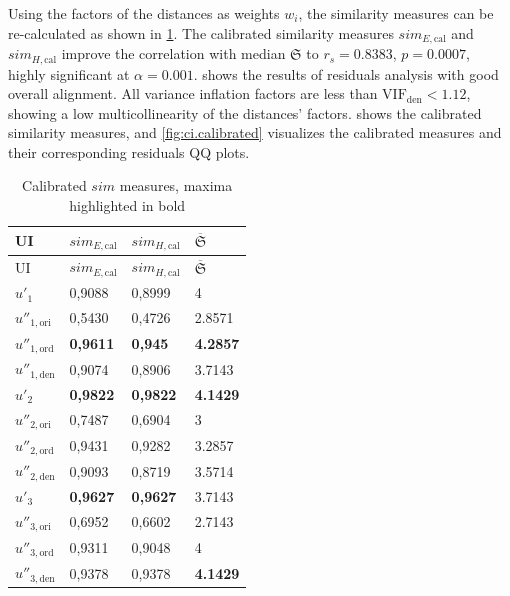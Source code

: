 \vspace{-15pt}
Using the factors of the distances as weights \(w_i\), the similarity measures can be re-calculated as shown in \cref{tbl:ci:sim-calibrated}.
The calibrated similarity measures \(sim_{E,\text{cal}}\) and \(sim_{H,\text{cal}}\) improve the correlation with median \(\mathfrak{S}\) to \(r_s=0.8383\), \(p=0.0007\), highly significant at \(\alpha = 0.001\).
 shows the results of residuals analysis with good overall alignment.
All variance inflation factors are less than \(\text{VIF}_{\text{den}} < 1.12\), showing a low multicollinearity of the distances' factors.
 shows the calibrated similarity measures, and \cref{fig:ci.calibrated} visualizes the calibrated measures and their corresponding residuals QQ plots.

\hypertarget{tbl:ci:sim-calibrated}{}
\begin{longtable}[]{@{}llll@{}}
\caption[Calibrated \(sim\) measures]{\label{tbl:ci:sim-calibrated}Calibrated \(sim\) measures, maxima highlighted in bold}\tabularnewline
\toprule
UI & \(sim_{E,\text{cal}}\) & \(sim_{H,\text{cal}}\) & \(\overline{\mathfrak{S}}\)\tabularnewline
\midrule
\endfirsthead
\toprule
UI & \(sim_{E,\text{cal}}\) & \(sim_{H,\text{cal}}\) & \(\overline{\mathfrak{S}}\)\tabularnewline
\midrule
\endhead
\(u'_1\) & 0,9088 & 0,8999 & 4\tabularnewline
\(u''_{1,\text{ori}}\) & 0,5430 & 0,4726 & 2.8571\tabularnewline
\(u''_{1,\text{ord}}\) & \textbf{0,9611} & \textbf{0,945} & \textbf{4.2857}\tabularnewline
\(u''_{1,\text{den}}\) & 0,9074 & 0,8906 & 3.7143\tabularnewline
\(u'_2\) & \textbf{0,9822} & \textbf{0,9822} & \textbf{4.1429}\tabularnewline
\(u''_{2,\text{ori}}\) & 0,7487 & 0,6904 & 3\tabularnewline
\(u''_{2,\text{ord}}\) & 0,9431 & 0,9282 & 3.2857\tabularnewline
\(u''_{2,\text{den}}\) & 0,9093 & 0,8719 & 3.5714\tabularnewline
\(u'_3\) & \textbf{0,9627} & \textbf{0,9627} & 3.7143\tabularnewline
\(u''_{3,\text{ori}}\) & 0,6952 & 0,6602 & 2.7143\tabularnewline
\(u''_{3,\text{ord}}\) & 0,9311 & 0,9048 & 4\tabularnewline
\(u''_{3,\text{den}}\) & 0,9378 & 0,9378 & \textbf{4.1429}\tabularnewline
\bottomrule
\end{longtable}
\pagebreak


